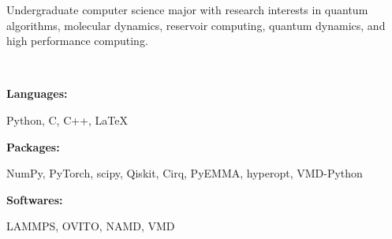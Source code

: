 \documentclass[9pt]{developercv} %
\begin{document}
\begin{minipage}[t]{0.46\textwidth}
\vspace{-6pt}

Undergraduate computer science major with research interests in quantum algorithms, molecular dynamics, reservoir computing, quantum dynamics, and high performance computing.\\
\end{minipage}
\hfill %
\begin{minipage}[t]{0.465\textwidth}
\\\begin{minipage}[t]{0.2\textwidth}
        \textbf{Languages:}
    \end{minipage}
    \hfill
    \begin{minipage}[t]{0.73\textwidth}
      Python, C, C++, \LaTeX
    \end{minipage}
    \vspace{4mm}
    
    \begin{minipage}[t]{0.2\textwidth}
        \textbf{Packages:}
    \end{minipage}
    \hfill
    \begin{minipage}[t]{0.73\textwidth}
    NumPy, PyTorch, scipy, Qiskit, Cirq, PyEMMA, hyperopt, VMD-Python
    \end{minipage}
	\vspace{4mm}

	\begin{minipage}[t]{0.2\textwidth}
        \textbf{Softwares:}
    \end{minipage}
    \hfill
    \begin{minipage}[t]{0.73\textwidth}
    LAMMPS, OVITO, NAMD, VMD
    \end{minipage}
    \vspace{1mm}
\end{minipage}
\end{document}
